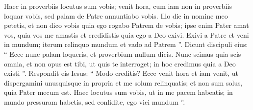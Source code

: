 \begin{biblechapter}
\begin{biblechapter}
\begin{biblechapter}
\begin{biblechapter}
\begin{biblechapter}
\begin{biblechapter}
\begin{biblechapter}
\begin{biblechapter}
\begin{biblechapter}
\begin{biblechapter}
\begin{biblechapter}
\begin{biblechapter}
\begin{biblechapter}
\begin{biblechapter}
\begin{biblechapter}
\begin{biblechapter}
\verse Haec in proverbiis locutus sum vobis; venit hora, cum iam non in proverbiis loquar vobis, sed palam de Patre annuntiabo vobis. 
\verse Illo die in nomine meo petetis, et non dico vobis quia ego rogabo Patrem de vobis; 
\verse ipse enim Pater amat vos, quia vos me amastis et credidistis quia ego a Deo exivi. 
\verse Exivi a Patre et veni in mundum; iterum relinquo mundum et vado ad Patrem ”. 
\verse Dicunt discipuli eius: “ Ecce nunc palam loqueris, et proverbium nullum dicis. 
\verse Nunc scimus quia scis omnia, et non opus est tibi, ut quis te interroget; in hoc credimus quia a Deo existi ”. 
\verse Respondit eis Iesus: “ Modo creditis? 
\verse Ecce venit hora et iam venit, ut dispergamini unusquisque in propria et me solum relinquatis; et non sum solus, quia Pater mecum est. 
\verse Haec locutus sum vobis, ut in me pacem habeatis; in mundo pressuram habetis, sed confidite, ego vici mundum ”.
 

\end{biblechapter}
\end{biblechapter}
\end{biblechapter}
\end{biblechapter}
\end{biblechapter}
\end{biblechapter}
\end{biblechapter}
\end{biblechapter}
\end{biblechapter}
\end{biblechapter}
\end{biblechapter}
\end{biblechapter}
\end{biblechapter}
\end{biblechapter}
\end{biblechapter}
\end{biblechapter}
